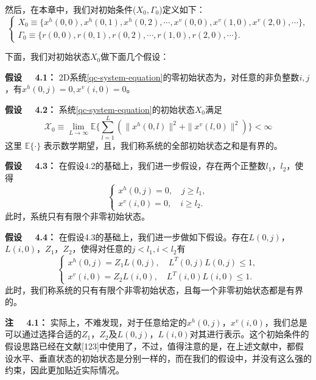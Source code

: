 	然后，在本章中，我们对初始条件($X_{0},\varGamma_{0}$)定义如下：
	\begin{equation*}
		\left\{
			\begin{array}{lr}
				X_{0}\equiv \big\{x^{h}(0,0),x^{h}(0,1),x^{h}(0,2),\cdots, x^{v}(0,0),x^{v}(1,0),x^{v}(2,0),\cdots  \big\},\\
				\varGamma_{0}\equiv \big\{r(0,0), r(0,1),r(0,2),\cdots,r(1,0),r(2,0),\cdots \big\}.
			\end{array}
		\right.
	\end{equation*}
	
	下面，我们对初始状态$X_{0}$做下面几个假设：
	
	{\bf 假设 \ \ 4.1：}
	2D系统\eqref{qc-system-equation}的零初始状态为，对任意的非负整数$i,j$，有$x^{h}(0,j) =0, x^{v}(i,0)=0$。
	
	{\bf 假设 \ \ 4.2：}
	系统\eqref{qc-system-equation}的初始状态$X_{0}$满足
	\begin{equation}
	\mathscr{X}_{0} \equiv \lim\limits_{L\to\infty}\mathbb{E}\Big\{\sum_{l=1}^{L}(\|x^{h}(0,l)\|^{2}+ \|x^{v}(l,0)\|^{2})\Big\} < \infty
	\end{equation}
	这里 $\mathbb{E}\{\cdot\}$ 表示数学期望，且，我们称系统的全部初始状态之和是有界的。
	
	{\bf 假设 \ \ 4.3：}
	在假设4.2的基础上，我们进一步假设，存在两个正整数$l_1$，$l_2$，使得
	\begin{equation}
		\left\{
		\begin{array}{lr}
		x^{h}(0,j)=0,\quad j\geq l_1,\\
		x^{v}(i,0)=0,\quad i\geq l_2.
		\end{array}
		\right.
	\end{equation}
	此时，系统只有有限个非零初始状态。
	
	{\bf 假设 \ \ 4.4：}
	在假设4.3的基础上，我们进一步做如下假设。存在$L(0,j)$，$L(i,0)$，$Z_1$，$Z_2$，使得对任意的$j<l_1,i<l_2$有
	\begin{equation}
		\left\{
		\begin{array}{lr}
		x^{h}(0,j)=Z_1L(0,j),\quad L^{T}(0,j)L(0,j)\leq 1,\\
		x^{v}(i,0)=Z_2L(i,0),\quad  L^{T}(i,0)L(i,0)\leq 1.
		\end{array}
		\right.
	\end{equation}
	此时，我们称系统的只有有限个非零初始状态，且每一个非零初始状态都是有界的。
	
	{\bf 注 \ \ 4.1：}
	实际上，不难发现，对于任意给定的$x^{h}(0,j)$，$x^{v}(i,0)$，我们总是可以通过选择合适的$Z_1$，$Z_2$及$L(0,j)$，$L(i,0)$对其进行表示。这个初始条件的假设思路已经在文献[123]中使用了，不过，值得注意的是，在上述文献中，都假设水平、垂直状态的初始状态是分别一样的，而在我们的假设中，并没有这么强的约束，因此更加贴近实际情况。
	
